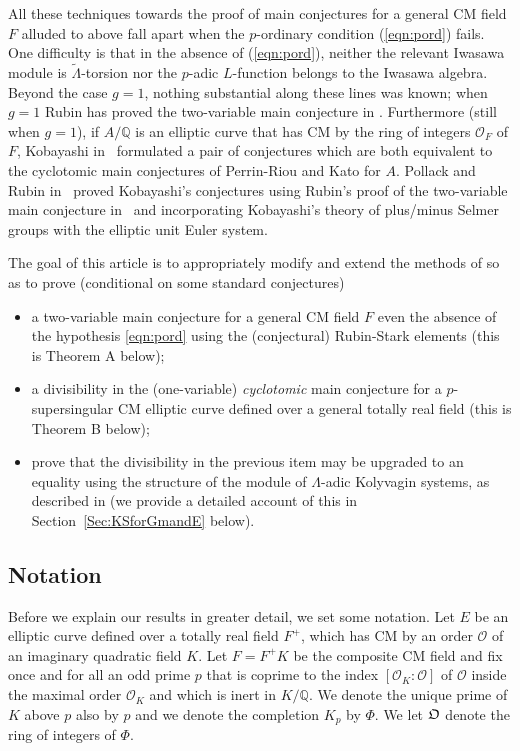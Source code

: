 \documentclass[12pt]{amsart}
\numberwithin{equation}{section}
\begin{document}
All these techniques towards the proof of main conjectures for a general CM field $F$ alluded to above fall apart when the $p$-ordinary condition (\ref{eqn:pord}) fails. One difficulty is that in the absence of (\ref{eqn:pord}), neither the relevant Iwasawa module is $\widetilde{\Lambda}$-torsion nor the $p$-adic $L$-function belongs to the Iwasawa algebra. Beyond the case $g=1$,  nothing substantial along these lines was known; when $g=1$ Rubin has proved the two-variable main conjecture in \cite{rubinmainconj}. Furthermore (still when $g=1$), if $A/{\mathbb{Q}}$ is an elliptic curve that has CM by the ring of integers ${\mathcal{O}}_F$ of $F$, Kobayashi in~\cite{kobayashi03} formulated a pair of conjectures which are both equivalent to the {cyclotomic} main conjectures of Perrin-Riou and Kato \cite{pr93grenoble,ka1} for $A$. Pollack and Rubin in~\cite{pollackrubin} proved Kobayashi's conjectures using Rubin's proof of the two-variable main conjecture in~\cite{rubinmainconj} and incorporating Kobayashi's theory of plus/minus Selmer groups with the elliptic unit Euler system.

The goal of this article is to appropriately modify and extend the methods of \cite{kbbCMabvar} so as to prove (conditional on some standard conjectures)
\begin{itemize}
\item a two-variable main conjecture for a general CM field $F$ even the absence of the hypothesis \eqref{eqn:pord} using the (conjectural) Rubin-Stark elements (this is Theorem A below);
\item a divisibility in the (one-variable) \emph{cyclotomic} main conjecture for a $p$-supersingular CM elliptic curve defined over a general totally real field (this is Theorem B below);
\item prove that the divisibility in the previous item may be upgraded to an equality using the structure of the module of ${\Lambda}$-adic Kolyvagin systems, as described in \cite{kbbdeform} (we provide a detailed account of this in Section~\ref{Sec:KSforGmandE} below).\end{itemize}

\subsection*{Notation}
Before we explain our results in greater detail, we set some notation. Let $E$ be an elliptic curve defined over a totally real field $F^+$, which has CM by an order ${\mathcal{O}}$ of an imaginary quadratic field $K$. Let $F=F^+K$ be the composite CM field and fix once and for all an odd prime $p$ that is coprime to the index $[{\mathcal{O}}_K:{\mathcal{O}}]$  of ${\mathcal{O}}$ inside the maximal order ${\mathcal{O}}_K$ and which is inert in $K/{\mathbb{Q}}$. We denote the unique prime of $K$ above $p$ also by $p$ and we denote the completion $K_p$ by $\Phi$. We let ${\frak{O}}$ denote the ring of integers of $\Phi$.
\end{document}
